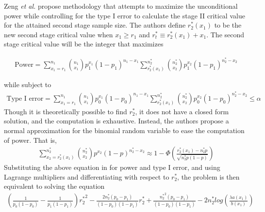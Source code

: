 \documentclass[12pt]{report}\usepackage[]{graphicx}\usepackage[]{color}
\newlength{\li}\setlength{\li}{14.48pt}
\newlength{\di}\setlength{\di}{-3.5mm}
\begin{document}
\indent Zeng \textit{et al.} \cite{Zeng} propose methodology that attempts to maximize the unconditional power while controlling for the type I error to calculate the stage II critical value for the attained second stage sample size. The authors define $r_2^\ast(x_1)$ to be the new second stage critical value when $x_1 \geq r_1$ and $r_t^\ast \equiv r_2^\ast(x_1) + x_1$. The second stage critical value will be the integer that maximizes 

\begin{equation}
\begin{aligned}
\mbox{Power} = \sum_{x_1 = r_1}^{n_1} {n_1 \choose x_1} p_1^{x_1} (1-p_1)^{n_1 - x_1} \sum_{r_2^\ast(x_1)}^{n_2^\ast} {n_2^\ast \choose x_2} p_1^{x_2} (1-p_1)^{{n_2^\ast}-x_2}
\end{aligned}
\end{equation}

while subject to 
\begin{equation}
\begin{aligned}
 \mbox{Type I error} = \sum_{x_1 = r_1}^{n_1} {n_1 \choose x_1} p_0^{x_1} (1-p_0)^{n_1 - x_1} \sum_{r_2^\ast(x_1)}^{n_2^\ast} {n_2^\ast \choose x_2} p_0^{x_2}(1-p_0)^{{n_2^\ast}-x_2} \leq \alpha
\end{aligned}
\end{equation}
Though it is theoretically possible to find $r_2^\ast$, it does not have a closed form solution, and the computation is exhaustive. Instead, the authors propose a normal approximation for the binomial random variable to ease the computation of power. That is, 
\begin{equation}
\begin{aligned}
\sum_{x_2 = r_2^\ast(x_1)}^{n_2^\ast} {n_2^\ast \choose x_2} p^{x_2} (1-p)^{n_2^\ast - x_2} \approx 1-\Phi \left(\frac{r_2^\ast(x_1) - n_2^\ast p}{\sqrt{n_2^\ast p(1-p)}} \right)
\end{aligned}
\end{equation}
Substituting the above equation in for power and type I error, and using Lagrange multipliers and differentiating with respect to $r_2^\ast$, the problem is then equivalent to solving the equation 
\begin{equation}
\begin{aligned}
\left(\frac{1}{p_0(1-p_0)} - \frac{1}{p_1(1-p_1)} \right) {r_2^\ast}^2 - \frac{2 n_2^\ast (p_0 - p_1)}{(1-p_0)(1-p_1)}r_2^\ast + \frac{{n_2^\ast}^2(p_0-p_1)}{(1-p_0)(1-p_1)}-2n_2^\ast log \left(\frac{\lambda a(x_1)}{b(x_1)}\right)
\end{aligned}
\end{equation}
\end{document}
